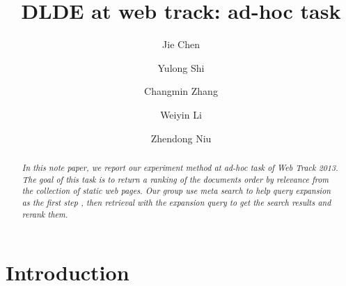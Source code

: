 \documentclass[runningheads,a4paper]{llncs}
\begin{document}
\mainmatter  %

\title{DLDE at web track: ad-hoc task}


%
%
\author{Jie Chen \and Yulong Shi \and Changmin Zhang \and Weiyin Li \and Zhendong Niu}

%


%
%

\maketitle

\begin{abstract}
\emph{In this note paper, we report our experiment method at ad-hoc task of Web Track 2013. The goal of this task is to return a ranking of the documents order by relevance from the collection of static web pages. Our group use meta search to help query expansion as the first step , then retrieval with the expansion query to get the search results and rerank them. }
\end{abstract}

\section{Introduction}
\end{document}
